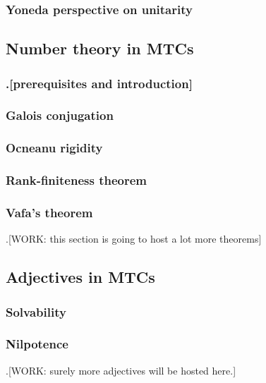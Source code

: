 \documentclass{article}
\theoremstyle{definition}
\numberwithin{figure}{section}
\begin{document}
\subsubsection{Yoneda perspective on unitarity}




\subsection{Number theory in MTCs}

\subsubsection{.[prerequisites and introduction]}

\subsubsection{Galois conjugation}

\subsubsection{Ocneanu rigidity}

\subsubsection{Rank-finiteness theorem}

\subsubsection{Vafa's theorem}

.[WORK: this section is going to host a lot more theorems]




\subsection{Adjectives in MTCs}

\subsubsection{Solvability}

\subsubsection{Nilpotence}

.[WORK: surely more adjectives will be hosted here.]
\end{document}
